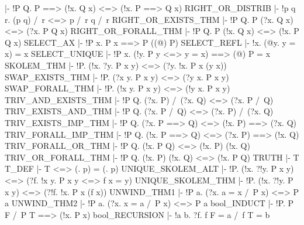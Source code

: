   |- !P Q. P ==> (!x. Q x) <=> (!x. P ==> Q x)
\ENDTHEOREM
\THEOREM RIGHT\_OR\_DISTRIB
  |- !p q r. (p \/ q) /\ r <=> p /\ r \/ q /\ r
\ENDTHEOREM
\THEOREM RIGHT\_OR\_EXISTS\_THM
  |- !P Q. P \/ (?x. Q x) <=> (?x. P \/ Q x)
\ENDTHEOREM
\THEOREM RIGHT\_OR\_FORALL\_THM
  |- !P Q. P \/ (!x. Q x) <=> (!x. P \/ Q x)
\ENDTHEOREM
\THEOREM SELECT\_AX
  |- !P x. P x ==> P ((@) P)
\ENDTHEOREM
\THEOREM SELECT\_REFL
  |- !x. (@y. y = x) = x
\ENDTHEOREM
\THEOREM SELECT\_UNIQUE
  |- !P x. (!y. P y <=> y = x) ==> (@) P = x
\ENDTHEOREM
\THEOREM SKOLEM\_THM
  |- !P. (!x. ?y. P x y) <=> (?y. !x. P x (y x))
\ENDTHEOREM
\THEOREM SWAP\_EXISTS\_THM
  |- !P. (?x y. P x y) <=> (?y x. P x y)
\ENDTHEOREM
\THEOREM SWAP\_FORALL\_THM
  |- !P. (!x y. P x y) <=> (!y x. P x y)
\ENDTHEOREM
\THEOREM TRIV\_AND\_EXISTS\_THM
  |- !P Q. (?x. P) /\ (?x. Q) <=> (?x. P /\ Q)
\ENDTHEOREM
\THEOREM TRIV\_EXISTS\_AND\_THM
  |- !P Q. (?x. P /\ Q) <=> (?x. P) /\ (?x. Q)
\ENDTHEOREM
\THEOREM TRIV\_EXISTS\_IMP\_THM
  |- !P Q. (?x. P ==> Q) <=> (!x. P) ==> (?x. Q)
\ENDTHEOREM
\THEOREM TRIV\_FORALL\_IMP\_THM
  |- !P Q. (!x. P ==> Q) <=> (?x. P) ==> (!x. Q)
\ENDTHEOREM
\THEOREM TRIV\_FORALL\_OR\_THM
  |- !P Q. (!x. P \/ Q) <=> (!x. P) \/ (!x. Q)
\ENDTHEOREM
\THEOREM TRIV\_OR\_FORALL\_THM
  |- !P Q. (!x. P) \/ (!x. Q) <=> (!x. P \/ Q)
\ENDTHEOREM
\THEOREM TRUTH
  |- T
\ENDTHEOREM
\THEOREM T\_DEF
  |- T <=> (\p. p) = (\p. p)
\ENDTHEOREM
\THEOREM UNIQUE\_SKOLEM\_ALT
  |- !P. (!x. ?!y. P x y) <=> (?f. !x y. P x y <=> f x = y)
\ENDTHEOREM
\THEOREM UNIQUE\_SKOLEM\_THM
  |- !P. (!x. ?!y. P x y) <=> (?!f. !x. P x (f x))
\ENDTHEOREM
\THEOREM UNWIND\_THM1
  |- !P a. (?x. a = x /\ P x) <=> P a
\ENDTHEOREM
\THEOREM UNWIND\_THM2
  |- !P a. (?x. x = a /\ P x) <=> P a
\ENDTHEOREM
\THEOREM bool\_INDUCT
  |- !P. P F /\ P T ==> (!x. P x)
\ENDTHEOREM
\THEOREM bool\_RECURSION
  |- !a b. ?f. f F = a /\ f T = b
\ENDTHEOREM

